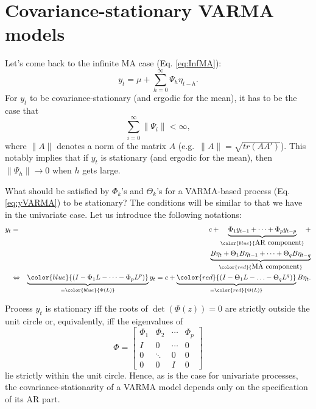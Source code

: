 \documentclass[
  12pt,
]{book}
\theoremstyle{definition}
\theoremstyle{definition}
\theoremstyle{definition}
\theoremstyle{definition}
\theoremstyle{remark}
\begin{document}
\hypertarget{covariance-stationary-varma-models}{%
\section{Covariance-stationary VARMA models}\label{covariance-stationary-varma-models}}

Let's come back to the infinite MA case (Eq. \eqref{eq:InfMA}):
\[
y_t = \mu + \sum_{h=0}^\infty \Psi_{h} \eta_{t-h}.
\]
For \(y_t\) to be covariance-stationary (and ergodic for the mean), it has to be the case that
\begin{equation}
\sum_{i=0}^\infty \|\Psi_i\| < \infty,\label{eq:condiInfiniteMA}
\end{equation}
where \(\|A\|\) denotes a norm of the matrix \(A\) (e.g.~\(\|A\|=\sqrt{tr(AA')}\)). This notably implies that if \(y_t\) is stationary (and ergodic for the mean), then \(\|\Psi_h\|\rightarrow 0\) when \(h\) gets large.

What should be satisfied by \(\Phi_k\)'s and \(\Theta_k\)'s for a VARMA-based process (Eq. \eqref{eq:yVARMA}) to be stationary? The conditions will be similar to that we have in the univariate case. Let us introduce the following notations:
\begin{eqnarray}
y_t &=& c + \underbrace{\Phi_1 y_{t-1} + \dots +\Phi_p y_{t-p}}_{\color{blue}{\mbox{AR component}}} +  \label{eq:VARMA2}\\
&&\underbrace{B \eta_t+ \Theta_1 B \eta_{t-1}+ \dots+ \Theta_q B \eta_{t-q}}_{\color{red}{\mbox{MA component}}} \nonumber\\
&\Leftrightarrow& \underbrace{ \color{blue}{(I - \Phi_1 L - \dots - \Phi_p L^p)}}_{= \color{blue}{\Phi(L)}}y_t = c +  \underbrace{ \color{red}{(I - \Theta_1 L - \ldots - \Theta_q L^q)}}_{=\color{red}{\Theta(L)}} B \eta_{t}. \nonumber
\end{eqnarray}

Process \(y_t\) is stationary iff the roots of \(\det(\Phi(z))=0\) are strictly outside the unit circle or, equivalently, iff the eigenvalues of
\begin{equation}
\Phi = \left[\begin{array}{cccc}
\Phi_{1} & \Phi_{2} & \cdots & \Phi_{p}\\
I & 0 & \cdots & 0\\
0 & \ddots & 0 & 0\\
0 & 0 & I & 0\end{array}\right]\label{eq:matrixPHI}
\end{equation}
lie strictly within the unit circle. Hence, as is the case for univariate processes, the covariance-stationarity of a VARMA model depends only on the specification of its AR part.
\end{document}
